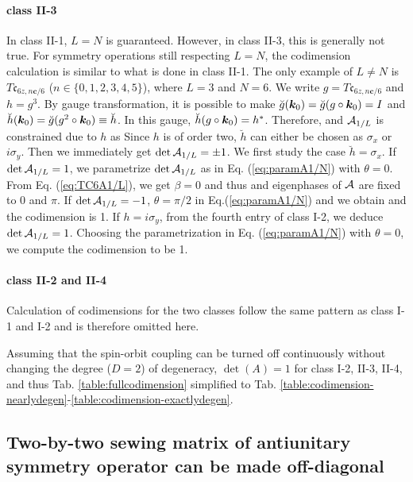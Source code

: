 \documentclass[aps, showpacs, twocolumn, notitlepage, superscriptaddress]{revtex4-1}
\begin{document}
\paragraph*{class II-3} In class II-1, $L=N$ is guaranteed. However, in class II-3, this is generally not true. For symmetry operations still respecting $L=N$, the codimension calculation is similar to what is done in class II-1. The only example of $L\ne N$ is $T\mathfrak{c}_{6z,n\boldsymbol{c}/6}$ ($n\in\{0,1,2,3,4,5\}$), where $L=3$ and $N=6$. We write $g=T\mathfrak{c}_{6z,n\boldsymbol{c}/6}$ and $h=g^3$. By gauge transformation, it is possible to make $\breve{g}(\boldsymbol{k}_0)=\breve{g}(g\circ\boldsymbol{k}_0)=I$ and $\breve{h}(\boldsymbol{k}_0)=\breve{g}(g^2\circ \boldsymbol{k}_0)\equiv\breve{h}$. In this gauge, $\breve{h}(g\circ\boldsymbol{k}_0)=h^*$. Therefore,
and ${\cal A}_{1/L}$ is constrained due to $h$ as 
Since $h$ is of order two, $\breve{h}$ can either be chosen as $\sigma_x$ or $i\sigma_y$. Then we immediately get $\det {\cal A}_{1/L} = \pm 1$. We first study the case $\breve{h}=\sigma_x$. If $\det {\cal A}_{1/L} = 1$, we parametrize $\det {\cal A}_{1/L}$ as in Eq. (\ref{eq:paramA1/N}) with $\theta=0$. From Eq. (\ref{eq:TC6A1/L}), we get $\beta=0$ and thus 
and eigenphases of ${\cal A}$ are fixed to $0$ and $\pi$. If $\det{{\cal A}_{1/L}}=-1$, $\theta=\pi/2$ in Eq.(\ref{eq:paramA1/N}) and we obtain
and the codimension is 1. If $h=i\sigma_y$, from the fourth entry of class I-2, we deduce $\det {\cal A}_{1/L}=1$. Choosing the parametrization in Eq. (\ref{eq:paramA1/N}) with $\theta=0$, we compute the codimension to be 1.

\paragraph*{class II-2 and II-4} Calculation of codimensions for the two classes follow the same pattern as class I-1 and I-2 and is therefore omitted here.

Assuming that the spin-orbit coupling can be turned off continuously without changing the degree ($D=2$) of degeneracy, $\det(A)=1$ for class I-2, II-3, II-4, and thus Tab. \ref{table:fullcodimension} simplified to Tab. \ref{table:codimension-nearlydegen}-\ref{table:codimension-exactlydegen}.

\subsection{Two-by-two sewing matrix of antiunitary symmetry operator can be made off-diagonal\label{app:makinggoffdiagonal}}
\end{document}
